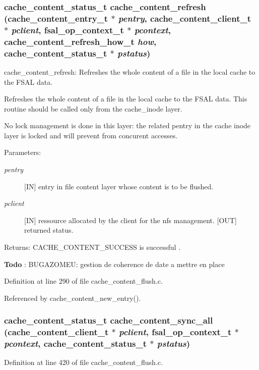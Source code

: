 \subsubsection{\setlength{\rightskip}{0pt plus 5cm}cache\_\-content\_\-status\_\-t cache\_\-content\_\-refresh (cache\_\-content\_\-entry\_\-t $\ast$ {\em pentry}, cache\_\-content\_\-client\_\-t $\ast$ {\em pclient}, fsal\_\-op\_\-context\_\-t $\ast$ {\em pcontext}, cache\_\-content\_\-refresh\_\-how\_\-t {\em how}, cache\_\-content\_\-status\_\-t $\ast$ {\em pstatus})}\label{cache__content__flush_8c_a1}


cache\_\-content\_\-refresh: Refreshes the whole content of a file in the local cache to the FSAL data.

Refreshes the whole content of a file in the local cache to the FSAL data. This routine should be called only from the cache\_\-inode layer.

No lock management is done in this layer: the related pentry in the cache inode layer is locked and will prevent from concurent accesses.

\begin{Desc}
\item[Parameters:]
\begin{description}
\item[{\em pentry}][IN] entry in file content layer whose content is to be flushed. \item[{\em pclient}][IN] ressource allocated by the client for the nfs management.  [OUT] returned status.\end{description}
\end{Desc}
\begin{Desc}
\item[Returns:]CACHE\_\-CONTENT\_\-SUCCESS is successful .\end{Desc}


\begin{Desc}
\item[{\bf Todo}]: BUGAZOMEU: gestion de coherence de date a mettre en place \end{Desc}


Definition at line 290 of file cache\_\-content\_\-flush.c.

Referenced by cache\_\-content\_\-new\_\-entry().
\subsubsection{\setlength{\rightskip}{0pt plus 5cm}cache\_\-content\_\-status\_\-t cache\_\-content\_\-sync\_\-all (cache\_\-content\_\-client\_\-t $\ast$ {\em pclient}, fsal\_\-op\_\-context\_\-t $\ast$ {\em pcontext}, cache\_\-content\_\-status\_\-t $\ast$ {\em pstatus})}\label{cache__content__flush_8c_a2}




Definition at line 420 of file cache\_\-content\_\-flush.c.